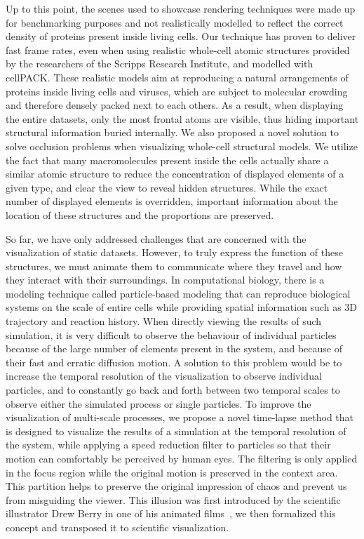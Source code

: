 Up to this point, the scenes used to showcase rendering techniques were made up for benchmarking purposes and not realistically modelled to reflect the correct density of proteins present inside living cells.
Our technique has proven to deliver fast frame rates, even when using realistic whole-cell atomic structures provided by the researchers of the Scripps Research Institute, and modelled with cellPACK.
These realistic models aim at reproducing a natural arrangements of proteins inside living cells and viruses, which are subject to molecular crowding and therefore densely packed next to each others.
As a result, when displaying the entire datasets, only the most frontal atoms are visible, thus hiding important structural information buried internally.
We also proposed a novel solution to solve occlusion problems when visualizing whole-cell structural models.
We utilize the fact that many macromolecules present inside the cells actually share a similar atomic structure to reduce the concentration of displayed elements of a given type, and clear the view to reveal hidden structures.
While the exact number of displayed elements is overridden, important information about the location of these structures and the proportions are preserved.

So far, we have only addressed challenges that are concerned with the visualization of static datasets.
However, to truly express the function of these structures, we must animate them to communicate where they travel and how they interact with their surroundings.
In computational biology, there is a modeling technique called particle-based modeling that can reproduce biological systems on the scale of entire cells while providing spatial information such as 3D trajectory and reaction history.
When directly viewing the results of such simulation, it is very difficult to observe the behaviour of individual particles because of the large number of elements present in the system, and because of their fast and erratic diffusion motion.
A solution to this problem would be to increase the temporal resolution of the visualization to observe individual particles, and to constantly go back and forth between two temporal scales to observe either the simulated process or single particles.
To improve the visualization of multi-scale processes, we propose a novel time-lapse method that is designed to visualize the results of a simulation at the temporal resolution of the system, while applying a speed reduction filter to particles so that their motion can comfortably be perceived by human eyes.
The filtering is only applied in the focus region while the original motion is preserved in the context area.
This partition helps to preserve the original impression of chaos and prevent us from misguiding the viewer.
This illusion was first introduced by the scientific illustrator Drew Berry in one of his animated films~\cite{Apoptosis}, we then formalized this concept and transposed it to scientific visualization.


